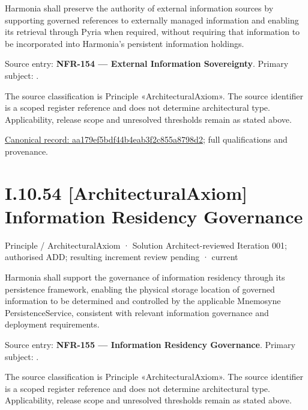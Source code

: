 Harmonia shall preserve the authority of external information sources by supporting governed references to externally managed information and enabling its retrieval through Pyria when required, without requiring that information to be incorporated into Harmonia's persistent information holdings.



Source entry: \textbf{NFR-154 — External Information Sovereignty}. Primary subject: \texttt{}.



The source classification is Principle «ArchitecturalAxiom». The source identifier is a scoped register reference and does not determine architectural type. Applicability, release scope and unresolved thresholds remain as stated above.


{\footnotesize \href{../../../../continuum/motivation/principle/architectural-axiom/aa179ef5bdf44b4eab3f2c855a8798d2.md}{Canonical record: aa179ef5bdf44b4eab3f2c855a8798d2}; full qualifications and provenance.}\par
\section*{I.10.54 [ArchitecturalAxiom] Information Residency Governance}
\label{navigation:I.10.54}

\label{element:349f526a401e4e299b854cbfedad0fca}
{\small Principle / ArchitecturalAxiom · Solution Architect-reviewed Iteration 001; authorised ADD; resulting increment review pending · current}\par

Harmonia shall support the governance of information residency through its persistence framework, enabling the physical storage location of governed information to be determined and controlled by the applicable Mnemosyne PersistenceService, consistent with relevant information governance and deployment requirements.



Source entry: \textbf{NFR-155 — Information Residency Governance}. Primary subject: \texttt{}.



The source classification is Principle «ArchitecturalAxiom». The source identifier is a scoped register reference and does not determine architectural type. Applicability, release scope and unresolved thresholds remain as stated above.


